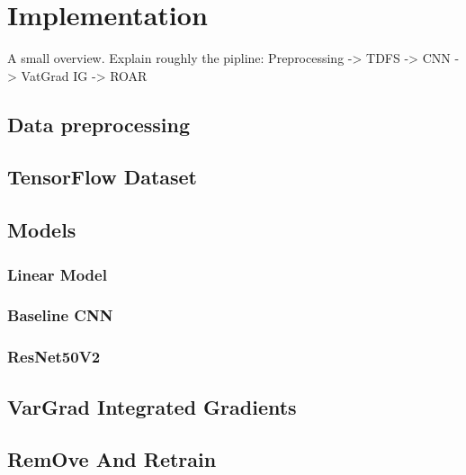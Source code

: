 \chapter{Implementation}
\label{ch:implementation}

A small overview. Explain roughly the pipline: Preprocessing -> TDFS -> CNN -> VatGrad IG -> ROAR

\section{Data preprocessing}
\label{sec:implementation:data_pp}


\section{TensorFlow Dataset}
\label{sec:implementation:tfds}

\section{Models}
\label{sec:implementation:models}

\subsection{Linear Model}
\label{sec:implementation:lm}

\subsection{Baseline CNN}
\label{sec:implementation:BL_CNN}

\subsection{ResNet50V2}
\label{sec:implementation:RN50V2}


\section{VarGrad Integrated Gradients}
\label{sec:implementation:VarGrad_IG}


\section{RemOve And Retrain}
\label{sec:implementation:ROAR}

